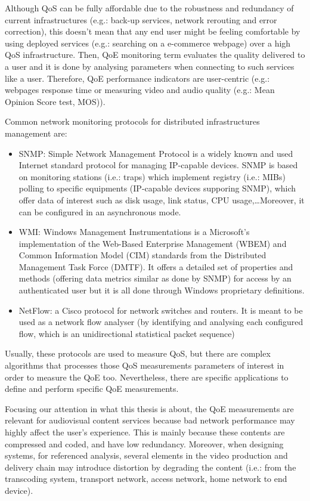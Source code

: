 Although QoS can be fully affordable due to the robustness and redundancy of current infrastructures (e.g.: back-up services, network rerouting and error correction), this doesn't mean that any end user might be feeling comfortable by using deployed services (e.g.: searching on a e-commerce webpage) over a high QoS infrastructure. Then, QoE monitoring term evaluates the quality delivered to a user and it is done by analysing parameters when connecting to such services like a user. Therefore, QoE performance indicators are user-centric (e.g.: webpages response time or measuring video and audio quality (e.g.: Mean Opinion Score test, MOS)).

Common network monitoring protocols for distributed infrastructures management are:

\begin{itemize}
\item SNMP: Simple Network Management Protocol is a widely known and used Internet standard protocol for managing IP-capable devices. SNMP is based on monitoring stations (i.e.: traps) which implement registry (i.e.: MIBs) polling to specific equipments (IP-capable devices supporing SNMP), which offer data of interest such as disk usage, link status, CPU usage,\ldots Moreover, it can be configured in an asynchronous mode.
\item WMI: Windows Management Instrumentations is a Microsoft's implementation of the Web-Based Enterprise Management (WBEM) and Common Information Model (CIM) standards from the Distributed Management Task Force (DMTF). It offers a detailed set of properties and methods (offering data metrics similar as done by SNMP) for access by an authenticated user but it is all done through Windows proprietary definitions.
\item NetFlow: a Cisco protocol for network switches and routers. It is meant to be used as a network flow analyser (by identifying and analysing each configured flow, which is an unidirectional statistical packet sequence) 
\end{itemize}  

Usually, these protocols are used to measure QoS, but there are complex algorithms that processes those QoS measurements parameters of interest in order to measure the QoE too. Nevertheless, there are specific applications to define and perform specific QoE measurements. 

Focusing our attention in what this thesis is about, the QoE measurements are relevant for audiovisual content services because bad network performance may highly affect the user's experience. This is mainly because these contents are compressed and coded, and have low redundancy. Moreover, when designing systems, for referenced analysis, several elements in the video production and delivery chain may introduce distortion by degrading the content (i.e.: from the transcoding system, transport network, access network, home network to end device).


